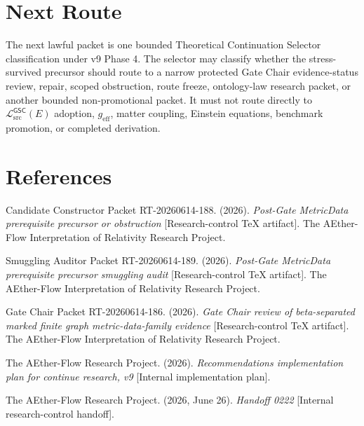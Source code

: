 \documentclass[11pt]{article}
\newcommand{\MetricData}{\mathcal{L}_{\mathrm{src}}^{\mathsf{GSC}}}
\newcommand{\geff}{g_{\mathrm{eff}}}
\begin{document}
\section{Next Route}

The next lawful packet is one bounded Theoretical Continuation Selector
classification under v9 Phase 4. The selector may classify whether the
stress-survived precursor should route to a narrow protected Gate Chair
evidence-status review, repair, scoped obstruction, route freeze,
ontology-law research packet, or another bounded non-promotional packet. It
must not route directly to \(\MetricData(E)\) adoption, \(\geff\), matter
coupling, Einstein equations, benchmark promotion, or completed derivation.

\section{References}

Candidate Constructor Packet RT-20260614-188. (2026). \textit{Post-Gate
MetricData prerequisite precursor or obstruction} [Research-control TeX
artifact]. The AEther-Flow Interpretation of Relativity Research Project.

Smuggling Auditor Packet RT-20260614-189. (2026). \textit{Post-Gate
MetricData prerequisite precursor smuggling audit} [Research-control TeX
artifact]. The AEther-Flow Interpretation of Relativity Research Project.

Gate Chair Packet RT-20260614-186. (2026). \textit{Gate Chair review of
beta-separated marked finite graph metric-data-family evidence}
[Research-control TeX artifact]. The AEther-Flow Interpretation of Relativity
Research Project.

The AEther-Flow Research Project. (2026). \textit{Recommendations
implementation plan for continue research, v9} [Internal implementation
plan].

The AEther-Flow Research Project. (2026, June 26). \textit{Handoff 0222}
[Internal research-control handoff].
\end{document}
